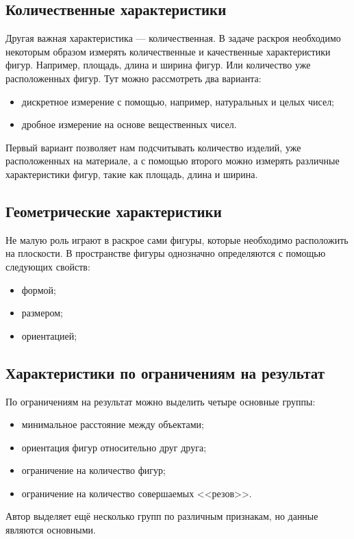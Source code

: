 \documentclass[14pt]{extarticle}
\begin{document}
	\subsection{Количественные характеристики}
	Другая важная характеристика --- количественная. В задаче раскроя необходимо
	некоторым образом измерять количественные и качественные характеристики фигур.
	Например, площадь, длина и ширина фигур. Или количество уже расположенных фигур. Тут можно рассмотреть два варианта:
	\begin{itemize}
		\item дискретное измерение с помощью, например, натуральных и целых чисел;
		\item дробное измерение на основе вещественных чисел.
	\end{itemize}


	Первый вариант позволяет нам подсчитывать количество изделий, уже расположенных
	на материале, а с помощью второго можно измерять различные характеристики фигур, 	такие как площадь, длина и ширина.
	\subsection{Геометрические характеристики}
	Не малую роль играют в раскрое сами фигуры, которые необходимо расположить
	на плоскости. В пространстве фигуры однозначно определяются с помощью следующих
	свойств:
	\begin{itemize}
		\item формой;
		\item размером;
		\item ориентацией;
	\end{itemize}
	\subsection{Характеристики по ограничениям на результат}
	По ограничениям на результат можно выделить четыре основные группы:
	\begin{itemize}
		\item  минимальное расстояние между объектами;
		\item ориентация фигур относительно друг друга;
		\item ограничение на количество фигур;
		\item ограничение на количество совершаемых <<резов>>.
	\end{itemize}


	Автор \cite{Dyckhoff} выделяет ещё несколько групп по различным признакам, но данные являются
	основными.
\end{document}
